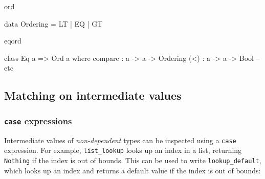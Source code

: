 \begin{SaveVerbatim}{ord}

data Ordering = LT | EQ | GT

\end{SaveVerbatim}

\begin{SaveVerbatim}{eqord}

class Eq a => Ord a where
    compare : a -> a -> Ordering
    (<) : a -> a -> Bool
    -- etc

\end{SaveVerbatim}

\subsection{Matching on intermediate values}

%
%
%
%
%
%
%
%
%

\subsubsection{\texttt{case} expressions}

Intermediate values of \emph{non-dependent} types can be inspected using a
\texttt{case} expression.  For example, \texttt{list\_lookup} looks up an index
in a list, returning \texttt{Nothing} if the index is out of bounds. This can
be used to write \texttt{lookup\_default}, which looks up an index and
returns a default value if the index is out of bounds:

